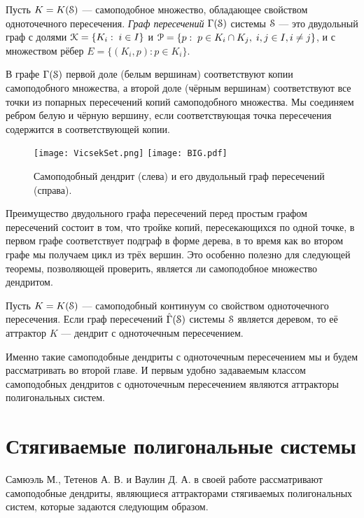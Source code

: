 \begin{definition}
Пусть $K=K({\EuScript S})$ --- самоподобное множество, обладающее свойством одноточечного пересечения.
{\em Граф пересечений} $\Gamma({\EuScript S})$ системы ${\EuScript S}$ --- это двудольный граф с долями ${\EuScript K}=\{K_i:\; i\in I\}$ и ${\EuScript P}=\{p:\;p\in K_i\cap K_j,\; i,j\in I, i\neq j\}$, и с множеством рёбер $E=\{(K_i,p):p\in K_i\}$.
\end{definition}

В графе $\Gamma({\EuScript S})$ первой доле (белым вершинам) соответствуют копии самоподобного множества, а второй доле (чёрным вершинам) соответствуют все точки из попарных пересечений копий самоподобного множества.
Мы соединяем ребром белую и чёрную вершину, если соответствующая точка пересечения содержится в соответствующей копии.

\begin{figure}[H]
\texttt{[image: VicsekSet.png]}
\hfill
\texttt{[image: BIG.pdf]}
\caption{Самоподобный дендрит (слева) и его двудольный граф пересечений (справа).}
\end{figure}

Преимущество двудольного графа пересечений перед простым графом пересечений состоит в том, что тройке копий, пересекающихся по одной точке, в первом графе соответствует подграф в форме дерева, в то время как во втором графе мы получаем цикл из трёх вершин.
Это особенно полезно для следующей теоремы, позволяющей проверить, является ли самоподобное множество дендритом.

\begin{theorem}
\label{thm:fpden}
Пусть $K=K({\EuScript S})$ --- самоподобный континуум со свойством одноточечного пересечения.
Если граф пересечений $\hat\Gamma({\EuScript S})$ системы ${\EuScript S}$ является деревом, то её аттрактор $K$ --- дендрит с одноточечным пересечением.
\end{theorem}



Именно такие самоподобные дендриты с одноточечным пересечением мы и будем рассматривать во второй главе.  
И первым удобно задаваемым классом самоподобных дендритов с одноточечным пересечением являются аттракторы полигональных систем.

\section{Стягиваемые полигональные системы}

Самюэль М., Тетенов А. В. и Ваулин Д. А. в своей работе \cite{STV2017} рассматривают самоподобные дендриты, являющиеся аттракторами стягиваемых полигональных систем, которые задаются следующим образом.

